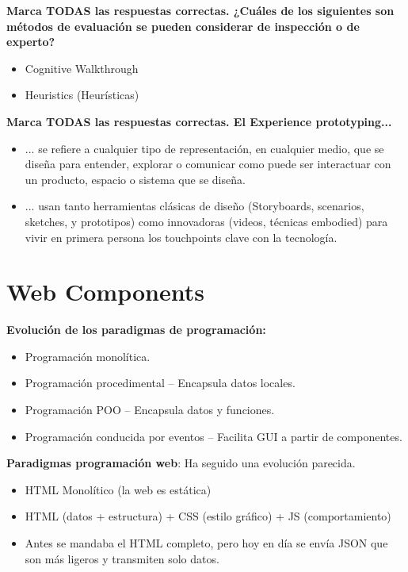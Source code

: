 \documentclass[12pt, twoside, openright]{report} %
\begin{document}
\textbf{Marca TODAS las respuestas correctas. ¿Cuáles de los siguientes son métodos de evaluación se pueden considerar de inspección o de experto?}
\begin{itemize}
  \item Cognitive Walkthrough
  \item Heuristics (Heurísticas)
\end{itemize}

\textbf{Marca TODAS las respuestas correctas. El Experience prototyping...}
\begin{itemize}
  \item ... se refiere a cualquier tipo de representación, en cualquier medio, que se diseña para entender, explorar o comunicar como puede ser interactuar con un producto, espacio o sistema que se diseña.
  \item ... usan tanto herramientas clásicas de diseño (Storyboards, scenarios, sketches, y prototipos) como innovadoras (videos, técnicas embodied) para vivir en primera persona los touchpoints clave con la tecnología.
\end{itemize}


\chapter{Web Components}

\textbf{Evolución de los paradigmas de programación:}

\begin{itemize}
  \item Programación monolítica.
  \item Programación procedimental -- Encapsula datos locales.
  \item Programación POO -- Encapsula datos y funciones.
  \item Programación conducida por eventos -- Facilita GUI a partir de componentes.
\end{itemize}

\textbf{Paradigmas programación web}: Ha seguido una evolución parecida.

\begin{itemize}
\item HTML Monolítico (la web es estática)
\item HTML (datos + estructura) + CSS (estilo gráfico) + JS (comportamiento)
\item Antes se mandaba el HTML completo, pero hoy en día se envía JSON que son más ligeros y transmiten solo datos.
\end{itemize}
\end{document}

